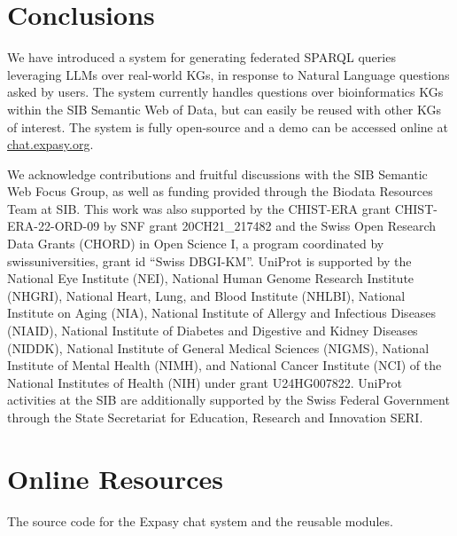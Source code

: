 \documentclass[
]{ceurart}
\begin{document}



\section{Conclusions}

We have introduced a system for generating federated SPARQL queries leveraging LLMs over real-world KGs, in response to Natural Language questions asked by users. The system currently handles questions over bioinformatics KGs within the SIB Semantic Web of Data, but can easily be reused with other KGs of interest. The system is fully open-source and a demo can be accessed online at \href{https://chat.expasy.org}{chat.expasy.org}.

\begin{acknowledgments}
We acknowledge contributions and fruitful discussions with the SIB Semantic Web Focus Group, as well as funding provided through the Biodata Resources Team at SIB. This work was also supported by the CHIST-ERA grant CHIST-ERA-22-ORD-09 by SNF grant 20CH21\_217482 and the Swiss Open Research Data Grants (CHORD) in Open Science I, a program coordinated by swissuniversities, grant id “Swiss DBGI-KM”. UniProt is supported by the National Eye Institute (NEI), National Human Genome Research Institute (NHGRI), National Heart, Lung, and Blood Institute (NHLBI), National Institute on Aging (NIA), National Institute of Allergy and Infectious Diseases (NIAID), National Institute of Diabetes and Digestive and Kidney Diseases (NIDDK), National Institute of General Medical Sciences (NIGMS), National Institute of Mental Health (NIMH), and National Cancer Institute (NCI) of the National Institutes of Health (NIH) under grant U24HG007822. UniProt activities at the SIB are additionally supported by the Swiss Federal Government through the State Secretariat for Education, Research and Innovation SERI.
\end{acknowledgments}



\appendix

\section{Online Resources}

The source code for the Expasy chat system and the reusable modules.
\end{document}

